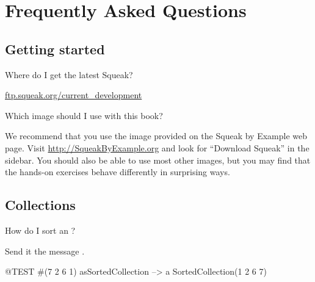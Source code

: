 \documentclass[a4paper,10pt,twoside]{book}
\begin{document}
	\renewcommand{\nnbb}[2]{} %
	\sloppy
\fi
\chapter{Frequently Asked Questions}
\label{app:faq}


\section{Getting started}
\begin{faq}
Where do I get the latest Squeak?
\end{faq}
\answer
\url{ftp.squeak.org/current_development}

\begin{faq}
Which \squeak image should I use with this book?
\end{faq}
\answer
We recommend that you use the image provided on the Squeak by Example web page.
Visit \url{http://SqueakByExample.org} and look for ``Download Squeak'' in the sidebar.
You should also be able to use most other images, but you may find that the hands-on exercises behave differently in surprising ways.


\section{Collections}

\begin{faq}
How do I sort an ?
\end{faq}
\answer
Send it the message .

\begin{code}{@TEST}
#(7 2 6 1) asSortedCollection --> a SortedCollection(1 2 6 7)
\end{code}
\end{document}

